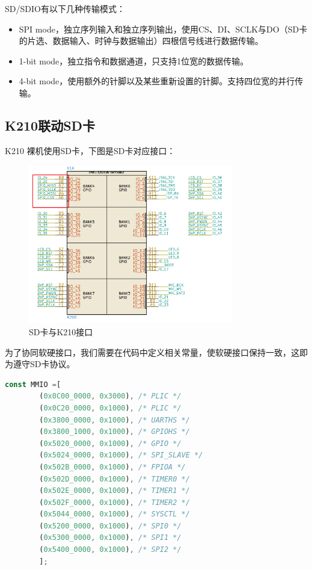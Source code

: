 SD/SDIO有以下几种传输模式：
\begin{itemize}
	\item SPI mode，独立序列输入和独立序列输出，使⽤CS、DI、SCLK与DO（SD卡的片选、数据输入、时钟与数据输出）四根信号线进行数据传输。
	\item 1-bit mode，独立指令和数据通道，只支持1位宽的数据传输。
	\item 4-bit mode，使用额外的针脚以及某些重新设置的针脚。支持四位宽的并行传输。
\end{itemize}

\subsection{K210联动SD卡}

K210 裸机使用SD卡，下图是SD卡对应接口：
\begin{figure}[H]
    \centering
    \includegraphics[width=0.8\textwidth]{figures/06-02-接口标.png}
    \caption{SD卡与K210接口}
\end{figure}

为了协同软硬接口，我们需要在代码中定义相关常量，使软硬接口保持一致，这即为遵守SD卡协议。
\begin{lstlisting}[language={Rust}, label={code:inode},
	caption={SD卡协议}]
    const MMIO =[
        (0x0C00_0000, 0x3000), /* PLIC */
        (0x0C20_0000, 0x1000), /* PLIC */
        (0x3800_0000, 0x1000), /* UARTHS */
        (0x3800_1000, 0x1000), /* GPIOHS */
        (0x5020_0000, 0x1000), /* GPIO */
        (0x5024_0000, 0x1000), /* SPI_SLAVE */
        (0x502B_0000, 0x1000), /* FPIOA */
        (0x502D_0000, 0x1000), /* TIMER0 */
        (0x502E_0000, 0x1000), /* TIMER1 */
        (0x502F_0000, 0x1000), /* TIMER2 */
        (0x5044_0000, 0x1000), /* SYSCTL */
        (0x5200_0000, 0x1000), /* SPI0 */
        (0x5300_0000, 0x1000), /* SPI1 */
        (0x5400_0000, 0x1000), /* SPI2 */
        ];
\end{lstlisting}


